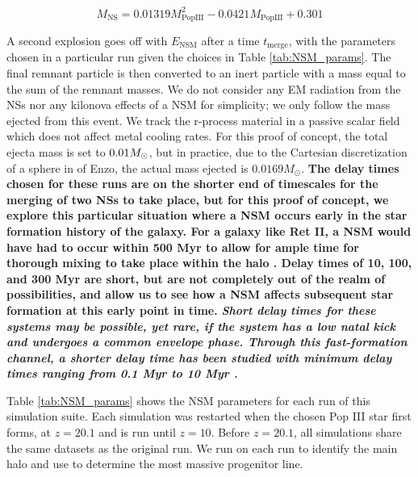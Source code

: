 \documentclass[fleqn,usenatbib]{mnras}
\begin{document}
\begin{equation} \label{eq:nsm_mass}
	M_{\mathrm{NS}} = 0.01319 M_{\mathrm{PopIII}}^{2} - 0.0421 M_{\mathrm{PopIII}} + 0.301
\end{equation}

A second explosion goes off with $E_{\textrm{NSM}}$ after a time $t_{\textrm{merge}}$, with the parameters chosen in a particular run given the choices in Table \ref{tab:NSM_params}. The final remnant particle is then converted to an inert particle with a mass equal to the sum of the remnant masses. We do not consider any EM radiation from the NSs nor any kilonova effects of a NSM for simplicity; we only follow the mass ejected from this event. We track the r-process material in a passive scalar field which does not affect metal cooling rates. For this proof of concept, the total ejecta mass is set to $0.01 \Ms$, but in practice, due to the Cartesian discretization of a sphere in of Enzo, the actual mass ejected is $0.0169 M_{\odot}$. \textbf{The delay times chosen for these runs are on the shorter end of timescales for the merging of two NSs to take place, but for this proof of concept, we explore this particular situation where a NSM occurs early in the star formation history of the galaxy. For a galaxy like Ret II, a NSM would have had to occur within 500 Myr to allow for ample time for thorough mixing to take place within the halo \citep{Simon23}. Delay times of 10, 100, and 300 Myr are short, but are not completely out of the realm of possibilities, and allow us to see how a NSM affects subsequent star formation at this early point in time.} \textbf{\textit{Short delay times for these systems may be possible, yet rare, if the system has a low natal kick and undergoes a common envelope phase. Through this fast-formation channel, a shorter delay time has been studied with minimum delay times ranging from 0.1 Myr to 10 Myr \citep{Belczynski01, Dominik12, Belczynski18,Jeon21}.}}

Table \ref{tab:NSM_params} shows the NSM parameters for each run of this simulation suite. Each simulation was restarted when the chosen Pop III star first forms, at $z = 20.1$ and is run until $z = 10$. Before $z = 20.1$, all simulations share the same datasets as the original run. We run \rockstar{} \citep{rockstar} on each run to identify the main halo and use \ytree{} \citep{ytree} to determine the most massive progenitor line.
\end{document}
